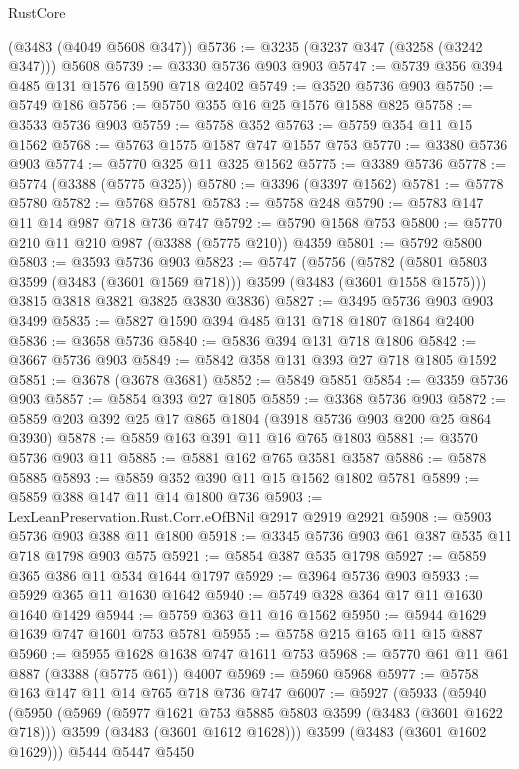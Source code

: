 \begin{lexlean}{RustCore}
\begin{coremodule}
    (@3483 (@4049 @5608 @347))
@5736 := @3235 (@3237 @347 (@3258 (@3242 @347))) @5608
@5739 := @3330 @5736 @903 @903
@5747 := @5739 @356 @394 @485 @131 @1576 @1590 @718 @2402
@5749 := @3520 @5736 @903
@5750 := @5749 @186
@5756 := @5750 @355 @16 @25 @1576 @1588 @825
@5758 := @3533 @5736 @903
@5759 := @5758 @352
@5763 := @5759 @354 @11 @15 @1562
@5768 := @5763 @1575 @1587 @747 @1557 @753
@5770 := @3380 @5736 @903
@5774 := @5770 @325 @11 @325 @1562
@5775 := @3389 @5736
@5778 := @5774 (@3388 (@5775 @325))
@5780 := @3396 (@3397 @1562)
@5781 := @5778 @5780
@5782 := @5768 @5781
@5783 := @5758 @248
@5790 := @5783 @147 @11 @14 @987 @718 @736 @747
@5792 := @5790 @1568 @753
@5800 := @5770 @210 @11 @210 @987 (@3388 (@5775 @210)) @4359
@5801 := @5792 @5800
@5803 := @3593 @5736 @903
@5823 := @5747
    (@5756
      (@5782 (@5801 @5803 @3599 (@3483 (@3601 @1569 @718))) @3599 (@3483 (@3601 @1558 @1575)))
      @3815
      @3818
      @3821
      @3825
      @3830
      @3836)
@5827 := @3495 @5736 @903 @903 @3499
@5835 := @5827 @1590 @394 @485 @131 @718 @1807 @1864 @2400
@5836 := @3658 @5736
@5840 := @5836 @394 @131 @718 @1806
@5842 := @3667 @5736 @903
@5849 := @5842 @358 @131 @393 @27 @718 @1805 @1592
@5851 := @3678 (@3678 @3681)
@5852 := @5849 @5851
@5854 := @3359 @5736 @903
@5857 := @5854 @393 @27 @1805
@5859 := @3368 @5736 @903
@5872 := @5859 @203 @392 @25 @17 @865 @1804 (@3918 @5736 @903 @200 @25 @864 @3930)
@5878 := @5859 @163 @391 @11 @16 @765 @1803
@5881 := @3570 @5736 @903 @11
@5885 := @5881 @162 @765 @3581 @3587
@5886 := @5878 @5885
@5893 := @5859 @352 @390 @11 @15 @1562 @1802 @5781
@5899 := @5859 @388 @147 @11 @14 @1800 @736
@5903 := LexLeanPreservation.Rust.Corr.eOfBNil @2917 @2919 @2921
@5908 := @5903 @5736 @903 @388 @11 @1800
@5918 := @3345 @5736 @903 @61 @387 @535 @11 @718 @1798 @903 @575
@5921 := @5854 @387 @535 @1798
@5927 := @5859 @365 @386 @11 @534 @1644 @1797
@5929 := @3964 @5736 @903
@5933 := @5929 @365 @11 @1630 @1642
@5940 := @5749 @328 @364 @17 @11 @1630 @1640 @1429
@5944 := @5759 @363 @11 @16 @1562
@5950 := @5944 @1629 @1639 @747 @1601 @753 @5781
@5955 := @5758 @215 @165 @11 @15 @887
@5960 := @5955 @1628 @1638 @747 @1611 @753
@5968 := @5770 @61 @11 @61 @887 (@3388 (@5775 @61)) @4007
@5969 := @5960 @5968
@5977 := @5758 @163 @147 @11 @14 @765 @718 @736 @747
@6007 := @5927
    (@5933
      (@5940
        (@5950
          (@5969
            (@5977 @1621 @753 @5885 @5803 @3599 (@3483 (@3601 @1622 @718)))
            @3599
            (@3483 (@3601 @1612 @1628)))
          @3599
          (@3483 (@3601 @1602 @1629)))
        @5444
        @5447
        @5450

\end{coremodule}
\end{lexlean}
